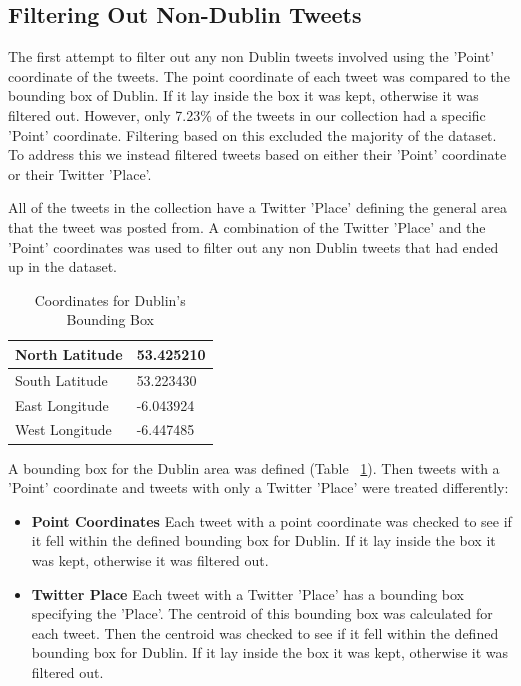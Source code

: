 \subsection*{Filtering Out Non-Dublin Tweets}

The first attempt to filter out any non Dublin tweets involved using the 'Point' coordinate of the tweets. The point coordinate of each tweet was compared to the bounding box of Dublin. If it lay inside the box it was kept, otherwise it was filtered out. However, only 7.23\% of the tweets in our collection had a specific 'Point' coordinate. Filtering based on this excluded the majority of the dataset. To address this we instead filtered tweets based on either their 'Point' coordinate or their Twitter 'Place'.

All of the tweets in the collection have a Twitter 'Place' defining the general area that the tweet was posted from. A combination of the Twitter 'Place' and the 'Point' coordinates was used to filter out any non Dublin tweets that had ended up in the dataset. 

\begin{table}[h!]
\caption{Coordinates for Dublin's Bounding Box}
\label{tab:dublinbb}
\begin{tabular}{|l|l|}
\hline
North Latitude  & 53.425210 \\ \hline
South Latitude  & 53.223430 \\ \hline
East Longitude & -6.043924 \\ \hline
West Longitude & -6.447485 \\ \hline
\end{tabular}
\end{table}

A bounding box for the Dublin area was defined (Table ~\ref{tab:dublinbb}). Then tweets with a 'Point' coordinate and tweets with only a Twitter 'Place' were treated differently:
\begin{itemize}
    \item \textbf{Point Coordinates}\newline
    Each tweet with a point coordinate was checked to see if it fell within the defined bounding box for Dublin. If it lay inside the box it was kept, otherwise it was filtered out.
    \item \textbf{Twitter Place}\newline
    Each tweet with a Twitter 'Place' has a bounding box specifying the 'Place'. The centroid of this bounding box was calculated for each tweet. Then the centroid was checked to see if it fell within the defined bounding box for Dublin. If it lay inside the box it was kept, otherwise it was filtered out.
\end{itemize}

